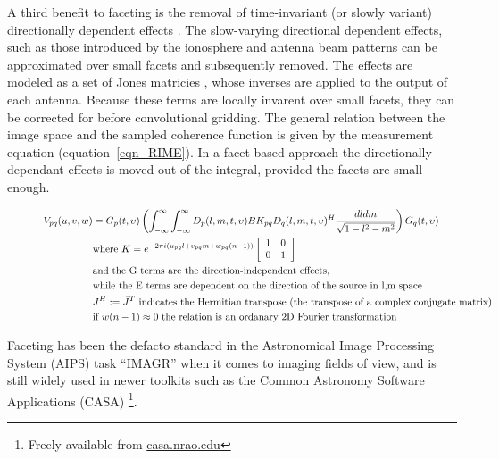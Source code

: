 \documentclass[a4paper, two column]{article}
\begin{document}
A third benefit to faceting is the removal of time-invariant (or slowly variant) directionally dependent effects \cite{2011A&A...527A.107S}. The slow-varying directional dependent effects, such as those introduced by the 
ionosphere and antenna beam patterns can be approximated over small facets and subsequently removed. The effects are modeled as a set of Jones matricies \cite{2011A&A...527A.106S}, whose inverses are applied to the output of each antenna. Because these terms are locally invarent over small 
facets, they can be corrected for before convolutional gridding. The general relation between the image space and the sampled coherence function is given by the measurement equation (equation~\ref{eqn_RIME}). In a facet-based approach
the directionally dependant effects is moved out of the integral, provided the facets are small enough.

\begin{figure}
\begin{mdframed}
\begin{equation}
\label{eqn_RIME}
\begin{split}
    V_{pq}(u,v,w) &= G_p(t,\upsilon)\left(\int_{-\infty}^{\infty}\int_{-\infty}^{\infty}D_p(l,m,t,\upsilon)BK_{pq}D_q(l,m,t,\upsilon)^H\frac{dldm}{\sqrt{1-l^2-m^2}}\right)G_q(t,\upsilon)\\
	  &\text{where }K = e^{-2\pi i(u_{pq}l+v_{pq}m+w_{pq}(n-1))}
    \left[\begin{array}{c c}
     1 & 0 \\
     0 & 1 \\
    \end{array}\right]\\
	 &\text{and the G terms are the direction-independent effects,}\\
	 &\text{while the E terms are dependent on the direction of the source in l,m space}\\
 	 &J^H:=\bar J^T \text{ indicates the Hermitian transpose (the transpose of a complex conjugate matrix)}\\ 
 	 &\text{if }w(n-1)\approx 0\text{ the relation is an ordanary 2D Fourier transformation}
\end{split}
\end{equation}
\end{mdframed}
\end{figure}

Faceting has been the defacto standard in the Astronomical Image Processing System (AIPS) task ``IMAGR'' \cite{AIPS113} when it comes to imaging fields of view, and is still 
widely used in newer toolkits such as the Common Astronomy Software Applications (CASA) \footnote{Freely available from \url{casa.nrao.edu}}. 
\end{document}
